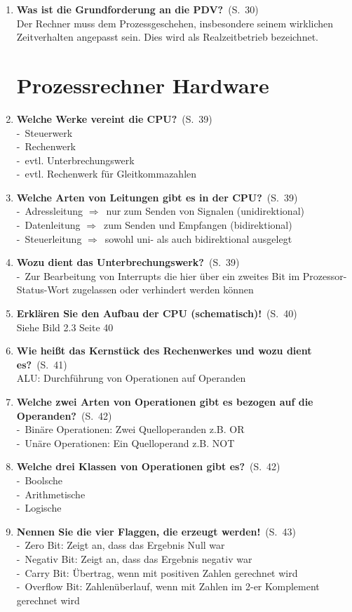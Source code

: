\documentclass[a4paper,12pt]{article}
\newcommand{\question}[3]{\pagebreak[3]\item {\textbf{#1?}}\ (S.\ #2)#3}
\newcommand{\statement}[3]{\pagebreak[3]\item {\textbf{#1!}}\ (S.\ #2)#3}
\newcommand{\catchword}[1]{\\-\ #1}
\newcommand{\normaltext}[1]{\\#1}
\newcommand{\resultol}[1]{$\Rightarrow$\ #1}
\newcommand{\page}[1]{#1}
\begin{document}
\begin{enumerate}
  \question{Was ist die Grundforderung an die PDV}{\page{30}}
  {
    \normaltext{Der Rechner muss dem Prozessgeschehen, insbesondere seinem wirklichen
                Zeitverhalten angepasst sein. Dies wird als Realzeitbetrieb bezeichnet.}
  }


  \newpage
  \section{Prozessrechner Hardware}


  \question{Welche Werke vereint die CPU}{\page{39}}
  {
    \catchword{Steuerwerk}
    \catchword{Rechenwerk}
    \catchword{evtl. Unterbrechungswerk}
    \catchword{evtl. Rechenwerk für Gleitkommazahlen}
  }

  \question{Welche Arten von Leitungen gibt es in der CPU}{\page{39}}
  {
    \catchword{Adressleitung \resultol{nur zum Senden von Signalen (unidirektional)}}
    \catchword{Datenleitung \resultol{zum Senden und Empfangen (bidirektional)}}
    \catchword{Steuerleitung \resultol{sowohl uni- als auch bidirektional ausgelegt}}
  }

  \question{Wozu dient das Unterbrechungswerk}{\page{39}}
  {
    \catchword{Zur Bearbeitung von Interrupts die hier über ein zweites Bit im Prozessor-
               Status-Wort zugelassen oder verhindert werden können}
  }

  \statement{Erklären Sie den Aufbau der CPU (schematisch)} {\page{40}}
  {
    \normaltext{Siehe Bild 2.3 Seite 40}
  }

  \question{Wie heißt das Kernstück des Rechenwerkes und wozu dient es}{\page{41}}
  {
    \normaltext{ALU: Durchführung von Operationen auf Operanden}
  }

  \question{Welche zwei Arten von Operationen gibt es bezogen auf die Operanden}{\page{42}}
  {
    \catchword{Binäre Operationen: Zwei Quelloperanden z.B. OR}
    \catchword{Unäre Operationen: Ein Quelloperand z.B. NOT}
  }

  \question{Welche drei Klassen von Operationen gibt es}{\page{42}}
  {
    \catchword{Boolsche}
    \catchword{Arithmetische}
    \catchword{Logische}
  }

  \statement{Nennen Sie die vier Flaggen, die erzeugt werden}{\page{43}}
  {
    \catchword{Zero Bit: Zeigt an, dass das Ergebnis Null war}
    \catchword{Negativ Bit: Zeigt an, dass das Ergebnis negativ war}
    \catchword{Carry Bit: Übertrag, wenn mit positiven Zahlen gerechnet wird}
    \catchword{Overflow Bit: Zahlenüberlauf, wenn mit Zahlen im 2-er Komplement gerechnet wird}
  }


\end{enumerate}
\end{document}
